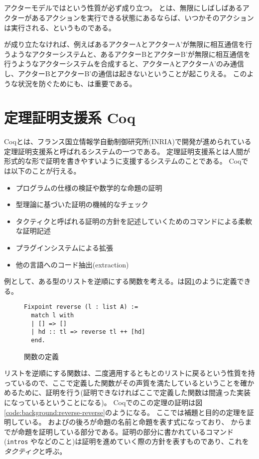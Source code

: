 \subsection{\fairness}

アクターモデルでは\fairness という性質が必ず成り立つ。
\fairness とは、無限にしばしばあるアクターがあるアクションを実行できる状態にあるならば、いつかそのアクションは実行される、というものである。

\fairness が成り立たなければ、例えばあるアクターAとアクターA'が無限に相互通信を行うようなアクターシステムと、あるアクターBとアクターB'が無限に相互通信を行うようなアクターシステムを合成すると、アクターAとアクターA'のみ通信し、アクターBとアクターB'の通信は起きないということが起こりえる。
このような状況を防ぐためにも、\fairness は重要である。


\section{定理証明支援系 Coq}

Coq\cite{Coq}とは、フランス国立情報学自動制御研究所(INRIA)で開発が進められている定理証明支援系と呼ばれるシステムの一つである。
定理証明支援系とは人間が形式的な形で証明を書きやすいように支援するシステムのことである。
Coqでは以下のことが行える。

\begin{itemize}
\item プログラムの仕様の検証や数学的な命題の証明
\item 型理論に基づいた証明の機械的なチェック
\item タクティクと呼ばれる証明の方針を記述していくためのコマンドによる柔軟な証明記述
\item プラグインシステムによる拡張
\item 他の言語へのコード抽出(extraction)
\end{itemize}

例として、ある型のリストを逆順にする関数を考える。は図\ref{code:background:reverse}のように定義できる。

\begin{figure}
\begin{lstlisting}
Fixpoint reverse (l : list A) :=
  match l with
  | [] => []
  | hd :: tl => reverse tl ++ [hd]
  end.
\end{lstlisting}
\label{code:background:reverse}
\caption{関数の定義}
\end{figure}

リストを逆順にする関数は、二度適用するともとのリストに戻るという性質を持っているので、ここで定義した関数がその声質を満たしているということを確かめるために、証明を行う(証明できなければここで定義した関数は間違った実装になっているということになる)。
Coqでのこの定理の証明は図\ref{code:background:reverse-reverse}のようになる。
ここでは補題と目的の定理を証明している。
およびの後ろが命題の名前と命題を表す式になっており、
からまでが命題を証明している部分である。証明の部分に書かれているコマンド(\lstinline{intros} やなどのこと)は証明を進めていく際の方針を表すものであり、これを\emph{タクティク}と呼ぶ。

